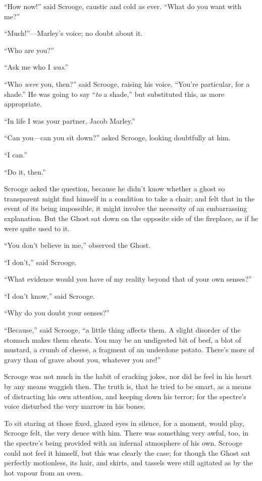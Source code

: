 \documentclass[paper=5.5in:8.5in,BCOR=15mm,twoside,DIV=15,headinclude=off,12pt,chapterprefix=off,openany,headings=huge]{scrbook} %
\begin{document}
\enquote{How now!} said Scrooge, caustic and cold as ever. \enquote{What do you want with me?}

\enquote{Much!}—Marley's voice; no doubt about it.

\enquote{Who are you?}

\enquote{Ask me who I \textit{was}.}

\enquote{Who \textit{were} you, then?} said Scrooge, raising his voice. \enquote{You're particular, for a shade.} He was going to say \enquote{\textit{to} a shade,} but substituted this, as more appropriate.

\enquote{In life I was your partner, Jacob Marley.}

\enquote{Can you—can you sit down?} asked Scrooge, looking doubtfully at him.

\enquote{I can.}

\enquote{Do it, then.}

Scrooge asked the question, because he didn't know whether a ghost so transparent might find himself in a condition to take a chair; and felt that in the event of its being impossible, it might involve the necessity of an embarrassing explanation. But the Ghost sat down on the opposite side of the fireplace, as if he were quite used to it.

\enquote{You don't believe in me,} observed the Ghost.

\enquote{I don't,} said Scrooge.

\enquote{What evidence would you have of my reality beyond that of your own senses?}

\enquote{I don't know,} said Scrooge.

\enquote{Why do you doubt your senses?}

\enquote{Because,} said Scrooge, \enquote{a little thing affects them. A slight disorder of the stomach makes them cheats. You may be an undigested bit of beef, a blot of mustard, a crumb of cheese, a fragment of an underdone potato. There's more of gravy than of grave about you, whatever you are!}

Scrooge was not much in the habit of cracking jokes, nor did he feel in his heart by any means waggish then. The truth is, that he tried to be smart, as a means of distracting his own attention, and keeping down his terror; for the spectre's voice disturbed the very marrow in his bones.

To sit staring at those fixed, glazed eyes in silence, for a moment, would play, Scrooge felt, the very deuce with him. There was something very awful, too, in the spectre's being provided with an infernal atmosphere of his own. Scrooge could not feel it himself, but this was clearly the case; for though the Ghost sat perfectly motionless, its hair, and skirts, and tassels were still agitated as by the hot vapour from an oven.
\end{document}
